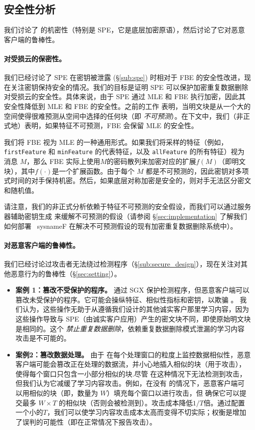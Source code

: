 \subsection{安全性分析}
\label{sub:security}
我们讨论了 \sysnameF 的机密性（特别是 SPE，它是底层加密原语），然后讨论了它对恶意客户端的鲁棒性。

\paragraph{对受损云的保密性。}
我们已经讨论了 SPE 在密钥被泄露 (\S\ref{sub:spe}) 时相对于 FBE 的安全性改进，现在关注密钥保持安全的情况。我们的目标是证明 SPE 可以保护加密重复数据删除对受损云的安全性。具体来说，由于 SPE 通过 MLE 和 FBE 执行加密，因此其安全性降低到 MLE 和 FBE 的安全性。之前的工作 \cite{bellare13a} 表明，当明文块是从一个大的空间使得很难预测从空间中选择的任何块（即 {\em 不可预测}）。在下文中，我们（非正式地）表明，如果特征不可预测，FBE 会保留 MLE 的安全性。


我们将 FBE 视为 MLE 的一种通用形式。如果我们将采样的特征（例如，{\tt firstFeature} 和 {\tt minFeature} 的代表特征，以及 {\tt allFeature} 的所有特征）视为消息 $M$，那么 FBE 实际上使用$M$的密码散列来加密对应的扩展$f(M)$（即明文块），其中$f(\cdot)$是一个扩展函数。由于每个 $M$ 都是不可预测的，因此密钥对多项式时间的对手保持机密。然后，如果底层对称加密是安全的，则对手无法区分密文和随机值。

请注意，我们的非正式分析依赖于特征不可预测的安全假设，而我们可以通过服务器辅助密钥生成 \cite{bellare13b} 来缓解不可预测的假设（请参阅 \S\ref{sec:implementation} 了解我们如何部署 \ sysnameF 在解决不可预测假设的现有加密重复数据删除系统中）。


\paragraph{对恶意客户端的鲁棒性。}
我们已经讨论过攻击者无法绕过检测程序（\S\ref{sub:secure_design}），现在关注对其他恶意行为的鲁棒性（\S\ref{sec:setting}）。


\begin{itemize}[leftmargin=*]
  \item {\bf 案例 1：篡改不受保护的程序。}
    \sysnameF 通过 SGX 保护检测程序，但恶意客户端可以篡改未受保护的程序。它可能会操纵特征、相似性指标和密钥，以欺骗 \sysnameF。
    我们认为，这些操作无助于从遵循我们设计的其他诚实客户那里学习内容，因为这些操作导致与 SPE（由诚实客户应用）产生的密文块不同，即使原始明文块是相同的。这个 {\em 禁止重复数据删除}，依赖重复数据删除模式泄漏的学习内容攻击是不可能的。
  \item {\bf 案例2：篡改数据处理。}
    由于 \sysnameF 在每个处理窗口的粒度上监控数据相似性，恶意客户端可能会篡改正在处理的数据流，并小心地插入相似的块（用于攻击），使得每个窗口只包含一小部分相似的块.尽管 \sysnameF 在这种情况下无法检测到攻击，但我们认为它减缓了学习内容攻击。例如，在没有 \sysnameF 的情况下，恶意客户端可以用相似的块（即，数量为 $W$）填充每个窗口以进行攻击，但 \sysnameF 确保它可以提交最多 $W\times T$ 的相似块（否则会被检测到）。攻击成本降低$1/T$倍。通过配置一个小的$T$，我们可以使学习内容攻击成本太高而变得不切实际；权衡是增加了误判的可能性（即在正常情况下报告攻击）。
\end{itemize}
  
